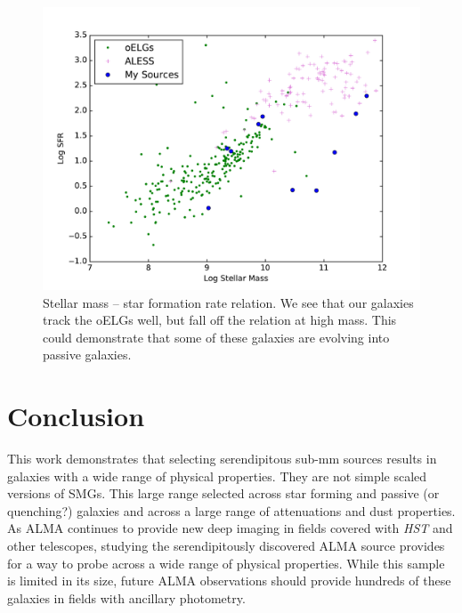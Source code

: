 \documentclass[preprint,natbib209]{aastex}
\begin{document}
\begin{figure}[t]
\centering
\includegraphics[scale=0.8]{main_seq.pdf}
\caption{Stellar mass -- star formation rate relation. We see that our galaxies track the oELGs well, but fall off the relation at high mass. This could demonstrate that some of these galaxies are evolving into passive galaxies.}
\label{fig:mainseq}
\end{figure}



\section{Conclusion}
\label{sec:conclusion}

This work demonstrates that selecting serendipitous sub-mm sources results in galaxies with a wide range of physical properties. They are not simple scaled versions of SMGs. This large range selected across star forming and passive (or quenching?) galaxies and across a large range of attenuations and dust properties. As ALMA continues to provide new deep imaging in fields covered with \textit{HST} and other telescopes, studying the serendipitously discovered ALMA source provides for a way to probe across a wide range of physical properties. While this sample is limited in its size, future ALMA observations should provide hundreds of these galaxies in fields with ancillary photometry.
\end{document}
